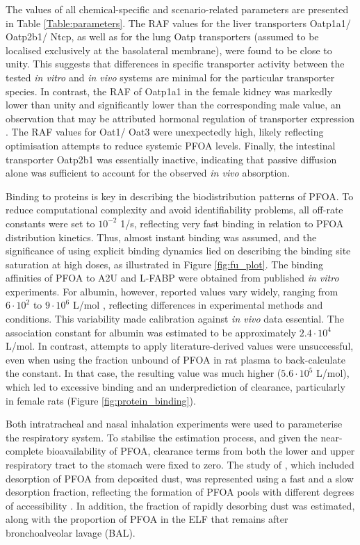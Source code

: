 \documentclass[preprint,12pt,authoryear]{elsarticle}
\begin{document}
The values of all chemical-specific and scenario-related parameters are presented in Table \ref{Table:parameters}. The RAF values for the liver transporters Oatp1a1/ Oatp2b1/ Ntcp, as well as for the lung Oatp transporters (assumed to be localised exclusively at the basolateral membrane), were found to be close to unity. This suggests that differences in specific transporter activity between the tested \textit{in vitro} and \textit{in vivo} systems are minimal for the particular transporter species. In contrast, the RAF of Oatp1a1 in the female kidney was markedly lower than unity and significantly lower than the corresponding male value, an observation that may be attributed hormonal regulation of transporter expression \citep{lu_1996, wood_2005}. The RAF values for Oat1/ Oat3 were unexpectedly high, likely reflecting optimisation attempts to reduce systemic PFOA levels. Finally, the intestinal transporter Oatp2b1 was essentially inactive, indicating that passive diffusion alone was sufficient to account for the observed \textit{in vivo} absorption.


Binding to proteins is key in describing the biodistribution patterns of PFOA. To reduce computational complexity and avoid identifiability problems, all off-rate constants were set to $10^{-2}$ 1/s, reflecting very fast binding in relation to PFOA distribution kinetics. Thus, almost instant binding was assumed, and the significance of using explicit binding dynamics lied on describing the binding site saturation at high doses, as illustrated in Figure \ref{fig:fu_plot}. The binding affinities of PFOA to A2U and L-FABP were obtained from published \textit{in vitro} experiments. For albumin, however, reported values vary widely, ranging from $6 \cdot 10^2$ \citep{macmanuspencer_2010} to $9 \cdot 10^6$ L/mol \citep{crisalli_2023}, reflecting differences in experimental methods and conditions. This variability made calibration against \textit{in vivo} data essential. The association constant for albumin was estimated to be approximately $2.4 \cdot 10^4$ L/mol. In contrast, attempts to apply literature-derived values were unsuccessful, even when using the fraction unbound of PFOA in rat plasma to back-calculate the constant. In that case, the resulting value was much higher ($5.6 \cdot 10^5$ L/mol), which led to excessive binding and an underprediction of clearance, particularly in female rats (Figure \ref{fig:protein_binding}).

Both intratracheal and nasal inhalation experiments were used to parameterise the respiratory system. To stabilise the estimation process, and given the near-complete bioavailability of PFOA, clearance terms from both the lower and upper respiratory tract to the stomach were fixed to zero. The study of \citet{gustafsson_2022}, which included desorption of PFOA from deposited dust, was represented using a fast and a slow desorption fraction, reflecting the formation of PFOA pools with different degrees of accessibility \citep{gustafsson_2022}. In addition, the fraction of rapidly desorbing dust was estimated, along with the proportion of PFOA in the ELF that remains after bronchoalveolar lavage (BAL).
\end{document}
